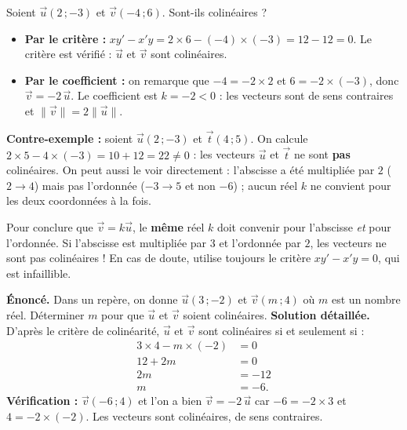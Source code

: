 \documentclass[11pt]{article}
\begin{document}
\begin{exemplebox}
Soient $\vec{u}(2\,;-3)$ et $\vec{v}(-4\,;6)$. Sont-ils colinéaires ?
\begin{itemize}
  \item \textbf{Par le critère :} $xy' - x'y = 2 \times 6 - (-4) \times (-3) = 12 - 12 = 0$. Le critère est vérifié : $\vec{u}$ et $\vec{v}$ sont colinéaires.
  \item \textbf{Par le coefficient :} on remarque que $-4 = -2 \times 2$ et $6 = -2 \times (-3)$, donc $\vec{v} = -2\,\vec{u}$. Le coefficient est $k = -2 < 0$ : les vecteurs sont de sens contraires et $\|\vec{v}\| = 2\|\vec{u}\|$.
\end{itemize}
\textbf{Contre-exemple :} soient $\vec{u}(2\,;-3)$ et $\vec{t}(4\,;5)$. On calcule $2 \times 5 - 4 \times (-3) = 10 + 12 = 22 \neq 0$ : les vecteurs $\vec{u}$ et $\vec{t}$ ne sont \textbf{pas} colinéaires. On peut aussi le voir directement : l'abscisse a été multipliée par $2$ ($2 \to 4$) mais pas l'ordonnée ($-3 \to 5$ et non $-6$) ; aucun réel $k$ ne convient pour les deux coordonnées à la fois.
\end{exemplebox}

\begin{attention}
Pour conclure que $\vec{v} = k\vec{u}$, le \textbf{même} réel $k$ doit convenir pour l'abscisse \emph{et} pour l'ordonnée. Si l'abscisse est multipliée par $3$ et l'ordonnée par $2$, les vecteurs ne sont pas colinéaires ! En cas de doute, utilise toujours le critère $xy' - x'y = 0$, qui est infaillible.
\end{attention}

\begin{exoresolu}
\textbf{Énoncé.} Dans un repère, on donne $\vec{u}(3\,;-2)$ et $\vec{v}(m\,;4)$ où $m$ est un nombre réel. Déterminer $m$ pour que $\vec{u}$ et $\vec{v}$ soient colinéaires.
\tcblower
\textbf{Solution détaillée.} D'après le critère de colinéarité, $\vec{u}$ et $\vec{v}$ sont colinéaires si et seulement si :
\begin{align*}
3 \times 4 - m \times (-2) &= 0 \\
12 + 2m &= 0 \\
2m &= -12 \\
m &= -6.
\end{align*}
\textbf{Vérification :} $\vec{v}(-6\,;4)$ et l'on a bien $\vec{v} = -2\,\vec{u}$ car $-6 = -2 \times 3$ et $4 = -2 \times (-2)$. Les vecteurs sont colinéaires, de sens contraires.
\end{exoresolu}
\end{document}
